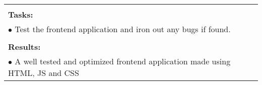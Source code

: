 \begin{table}[!h]
\begin{center}
\begin{tabular}{|p{}||p{}|p{}||p{}|}
            \multicolumn{4}{|p{.95\columnwidth}|}{}\\
            \multicolumn{4}{|p{.95\columnwidth}|}{\textbf{Tasks:}}\\
            \multicolumn{4}{|p{.95\columnwidth}|}{$\bullet$ Test the frontend application and iron out any bugs if found.}\\
            \multicolumn{4}{|p{.95\columnwidth}|}{}\\
            \multicolumn{4}{|p{.95\columnwidth}|}{\textbf{Results:}}\\
            \multicolumn{4}{|p{.95\columnwidth}|}{$\bullet$ A well tested and optimized frontend application made using HTML, JS and CSS}\\
            \hline
        \end{tabular}
    \end{center}
\end{table}

\clearpage


